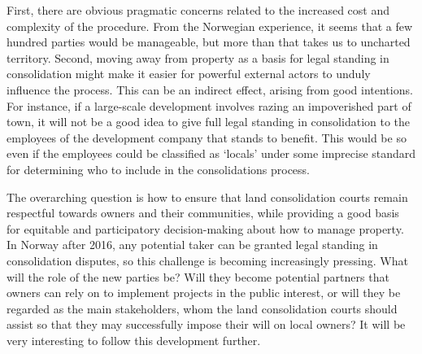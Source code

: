 First, there are obvious pragmatic concerns related to the increased cost and complexity of the procedure. From the Norwegian experience, it seems that a few hundred parties would be manageable, but more than that takes us to uncharted territory. Second, moving away from property as a basis for legal standing in consolidation might make it easier for powerful external actors to unduly influence the process. This can be an indirect effect, arising from good intentions. For instance, if a large-scale development involves razing an impoverished part of town, it will not be a good idea to give full legal standing in consolidation to the employees of the development company that stands to benefit. This would be so even if the employees could be classified as `locals' under some imprecise standard for determining who to include in the consolidations process.


The overarching question is how to ensure that land consolidation courts remain respectful towards owners and their communities, while providing a good basis for equitable and participatory decision-making about how to manage property. In Norway after 2016, any potential taker can be granted legal standing in consolidation disputes, so this challenge is becoming increasingly pressing. What will the role of the new parties be? Will they become potential partners that owners can rely on to implement projects in the public interest, or will they be regarded as the main stakeholders, whom the land consolidation courts should assist so that they may successfully impose their will on local owners? It will be very interesting to follow this development further.

